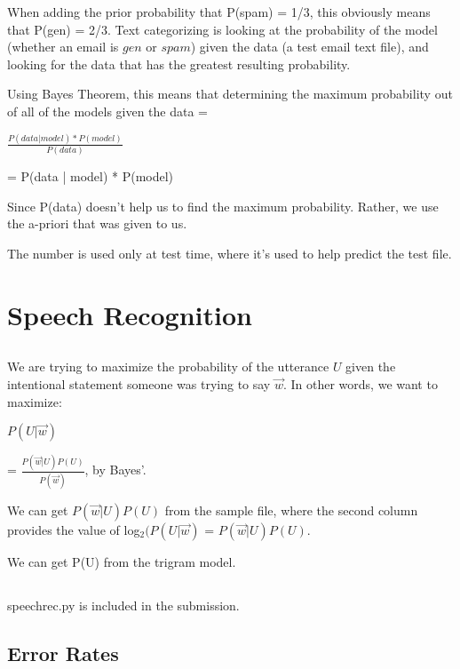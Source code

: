 \documentclass[12pt, letterpaper]{article}
\begin{document}
When adding the prior probability that P(spam) = 1/3, this obviously means that P(gen) = 2/3. Text categorizing is looking at the probability of the model (whether an email is $gen$ or $spam$) given the data (a test email text file), and looking for the data that has the greatest resulting probability.

Using Bayes Theorem, this means that determining the maximum probability out of all of the models given the data = 

$\frac{P(data | model) * P(model)}{P(data)}$ 

= P(data | model) * P(model)

Since P(data) doesn't help us to find the maximum probability. Rather, we use the a-priori that was given to us. 


The number is used only at test time, where it's used to help predict the test file. 

\section{Speech Recognition}
\subsection{}

We are trying to maximize the probability of the utterance $U$ given the intentional statement someone was trying to say $\overrightarrow{w}$. In other words, we want to maximize: 

$P(U|\overrightarrow{w})$

= $\frac{P(\overrightarrow{w}|U) P(U)}{P(\overrightarrow{w})}$, by Bayes'.

We can get $P(\overrightarrow{w}|U) P(U)$ from the sample file, where the second column provides the value of log$_{2}(P(U|\overrightarrow{w})$ = $P(\overrightarrow{w}|U) P(U)$.

We can get P(U) from the trigram model. 

\subsection{}
speechrec.py is included in the submission.

\subsection{Error Rates}
\end{document}

